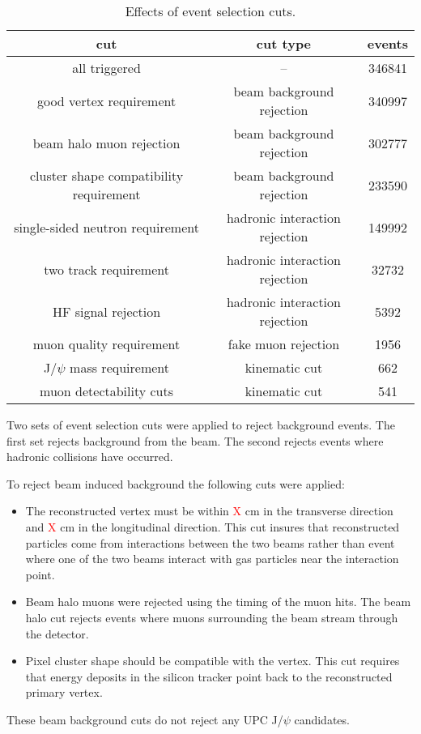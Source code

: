       \begin{table}
        \centering
        \begin{tabular}{|c|c|c|} \hline 
          cut & cut type & events \\ \hline
          all triggered & -- & 346841 \\ \hline
          good vertex requirement & beam background rejection & 340997 \\ \hline
          beam halo muon rejection & beam background rejection & 302777 \\ \hline
          cluster shape compatibility requirement & beam background rejection & 233590 \\ \hline
          single-sided neutron requirement & hadronic interaction rejection & 149992 \\ \hline
          two track requirement & hadronic interaction rejection & 32732 \\ \hline
          HF signal rejection & hadronic interaction rejection & 5392 \\ \hline
          muon quality requirement & fake muon rejection & 1956\\ \hline
          J/$\psi$ mass requirement & kinematic cut & 662 \\ \hline
          muon detectability cuts & kinematic cut & 541 \\ \hline
        \end{tabular}
        \caption{Effects of event selection cuts.}
        \label{tab:evSelCutNumbers}
      \end{table}

      Two sets of event selection cuts were applied to reject background events. 
      The first set rejects background from the beam.
      The second rejects events where hadronic collisions have occurred.

      To reject beam induced background the following cuts were applied:
      \begin{itemize}
        \item The reconstructed vertex must be within \textcolor{red}{X} cm in 
          the transverse direction and \textcolor{red}{X} cm in the 
          longitudinal direction. This cut insures that reconstructed particles 
          come from interactions between the two beams rather than event where 
          one of the two beams interact with gas particles near the interaction 
          point. 
  	    \item Beam halo muons were rejected using the timing of the muon hits.
              The beam halo cut rejects events where muons surrounding the beam 
              stream through the detector. 
  	    \item Pixel cluster shape should be compatible with the vertex. 
          This cut requires that energy deposits in the silicon tracker point 
            back to the reconstructed  primary vertex. 
      \end{itemize}
      These beam background cuts do not reject any UPC J/$\psi$ candidates. 

